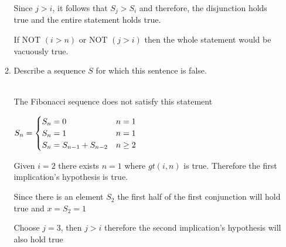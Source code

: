 \documentclass[11pt]{article}
\newcommand{\Not}{\mbox{NOT }}
\begin{document}
\begin{enumerate}
\begin{enumerate}
\begin{solution}
Since $j>i$, it follows that $S_j>S_i$ and therefore, the disjunction holds true and the entire statement holds true.

If $\Not(i>n)$ or $\Not(j>i)$ then the whole statement would be vacuously true.

\end{solution}
\item
\begin{question}
Describe a sequence $S$ for which this sentence is false.
\end{question}
\begin{solution} \\

The Fibonacci sequence does not satisfy this statement

$S_n =
    \begin{cases}
        S_n = 0 & n=1 \\
        S_n=1 & n=1 \\
        S_n = S_{n-1} + S_{n-2} & n \ge 2
    \end{cases} \\
$

Given $i=2$ there exists $n=1$ where $gt(i,n)$ is true. Therefore the first implication's hypothesis is true.

Since there is an element $S_2$ the first half of the first conjunction will hold true and $x=S_2=1$

Choose $j=3$, then $j > i$ therefore the second implication's hypothesis will also hold true


\end{solution}
\end{enumerate}
\end{enumerate}
\end{document}
